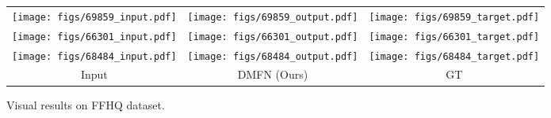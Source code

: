\documentclass[journal]{IEEEtran}
\begin{document}
\begin{figure}[ht]
	\centering
	\begin{adjustbox}{valign=t}
		\begin{tabular}{ccc}
			\texttt{[image: figs/69859\_input.pdf]} &
			\hspace{-4mm}
			\texttt{[image: figs/69859\_output.pdf]} &
			\hspace{-4mm}
			\texttt{[image: figs/69859\_target.pdf]} \\
			
			
			\texttt{[image: figs/66301\_input.pdf]} &
			\hspace{-4mm}
			\texttt{[image: figs/66301\_output.pdf]} &
			\hspace{-4mm}
			\texttt{[image: figs/66301\_target.pdf]} \\
			
			
			\texttt{[image: figs/68484\_input.pdf]} &
			\hspace{-4mm}
			\texttt{[image: figs/68484\_output.pdf]} &
			\hspace{-4mm}
			\texttt{[image: figs/68484\_target.pdf]} \\
			Input & \hspace{-4mm} DMFN (Ours) & \hspace{-4mm} GT \\
		\end{tabular}
	\end{adjustbox}
	\caption{Visual results on FFHQ dataset.}
	\label{fig:ffhq}
\end{figure}
\end{document}
